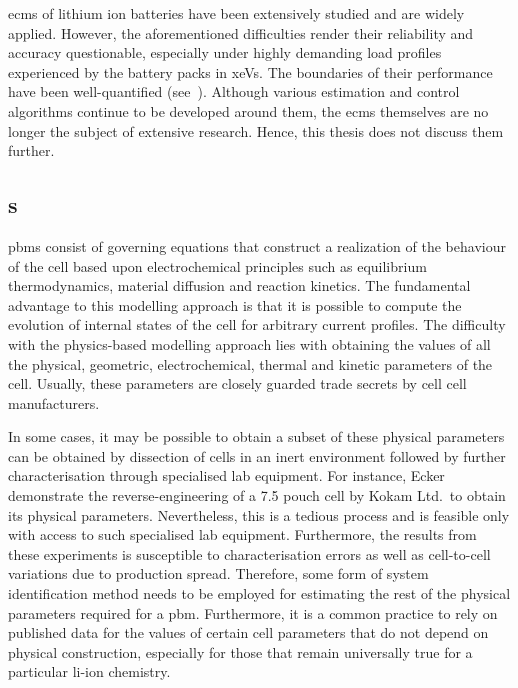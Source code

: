 \glspl{ecm}  of  lithium  ion  batteries   have  been  extensively  studied  and
are  widely  applied.  However,  the aforementioned  difficulties  render  their
reliability and  accuracy questionable,  especially under highly  demanding load
profiles  experienced by  the battery  packs in  \glspl{xeV}. The  boundaries of
their  performance have  been well-quantified  (see~\cite{Plett2015,Plett2016}).
Although  various estimation  and control  algorithms continue  to be  developed
around them, the  \glspl{ecm} themselves are no longer the  subject of extensive
research. Hence, this thesis does not discuss them further.

\subsection{s}\label{subsec:pbms}


\glspl{pbm} consist of  governing equations that construct a  realization of the
behaviour of the cell based  upon electrochemical principles such as equilibrium
thermodynamics,  material  diffusion  and  reaction  kinetics.  The  fundamental
advantage  to this  modelling approach  is that  it is  possible to  compute the
evolution of  internal states of  the cell  for arbitrary current  profiles. The
difficulty with  the physics-based  modelling approach  lies with  obtaining the
values  of all  the physical,  geometric, electrochemical,  thermal and  kinetic
parameters  of the  cell. Usually,  these parameters  are closely  guarded trade
secrets by cell cell manufacturers.

In  some  cases, it  may  be  possible to  obtain  a  subset of  these  physical
parameters  can be  obtained  by dissection  of cells  in  an inert  environment
followed  by further  characterisation  through specialised  lab equipment.  For
instance, Ecker~\etal~\cite{Ecker2015} demonstrate  the reverse-engineering of a
\SI{7.5}{\amphour} pouch cell by Kokam  Ltd.\ to obtain its physical parameters.
Nevertheless, this is a tedious process and is feasible only with access to such
specialised lab  equipment. Furthermore, the  results from these  experiments is
susceptible to characterisation errors as well as cell-to-cell variations due to
production spread. Therefore, some form of system identification method needs to
be employed  for estimating the rest  of the physical parameters  required for a
\gls{pbm}.  Furthermore, it  is  a common  practice to  rely  on published  data
for  the values  of  certain cell  parameters  that do  not  depend on  physical
construction, especially for those that remain universally true for a particular
li-ion chemistry.

